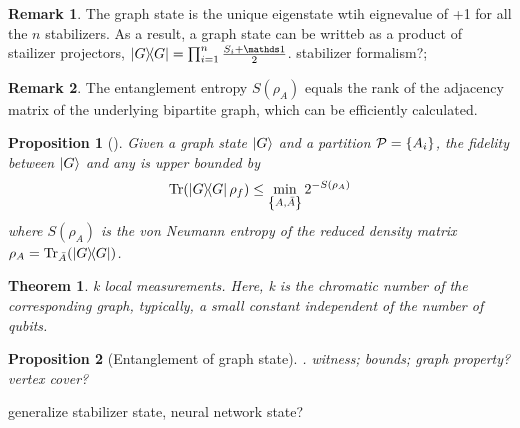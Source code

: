 \documentclass[
10pt,
aps,
pra,
linenumbers,
floatfix,
]{revtex4-2}
\theoremstyle{plain}
\newtheorem{theorem}{Theorem}
\newtheorem{proposition}{Proposition}
\theoremstyle{definition}
\newtheorem{remark}{Remark}
\newcommand{\dm}{\rho}
\begin{document}
\begin{remark}
	The graph state is the unique eigenstate wtih eignevalue of +1 for all the $n$ stabilizers.
	As a result, a graph state can be writteb as a product of stailizer projectors, $\op{G}=\prod_{i=1}^n \frac{S_i +\identity}{2}$.
	stabilizer formalism?; 
\end{remark}
\begin{remark}
	The entanglement entropy $S( \dm_A )$ equals the rank of the adjacency matrix of the underlying bipartite graph, which can be efficiently calculated.
\end{remark}
\begin{proposition}[\cite{zhouDetectingMultipartiteEntanglement2019}]
	Given a graph state $\ket{G}$ and a partition $\mathcal{P}=\qty{A_i}$, the fidelity between $\ket{G}$ and any  is upper bounded by
	\begin{equation}
		\Tr(\op{G} \dm_f) \le \min_{\qty{A,\bar{A}}} 2^{-S(\dm_A)}
	\end{equation}
	where $S(\dm_A)$ is the von Neumann entropy of the reduced density matrix $\dm_A=\Tr_{\bar{A}}(\op{G})$.
\end{proposition}
\begin{theorem}
	k local measurements. Here, k is the chromatic number of the corresponding graph, typically, a small constant independent of the number of qubits.
\end{theorem}
\begin{proposition}[Entanglement of graph state]
	\cite{heinEntanglementGraphStates2006}.
	witness; bounds; graph property? vertex cover?
\end{proposition}
generalize \cite{zhangEfficientEntanglementGeneration2021}
stabilizer state, neural network state?
\end{document}
